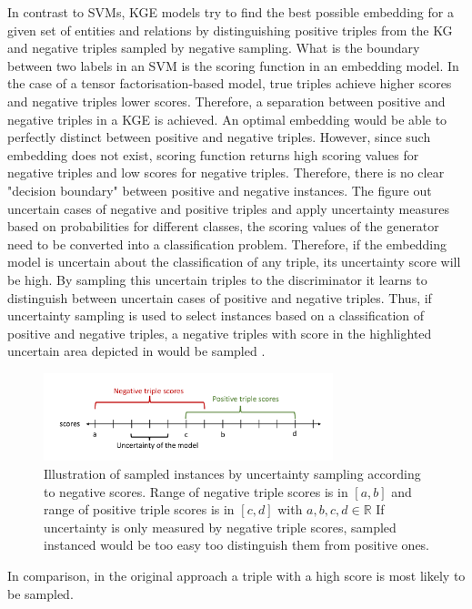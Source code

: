 In contrast to \acp{SVM}, \ac{KGE} models try to find the best possible embedding for a given set of entities and relations by distinguishing positive triples from the \ac{KG} and negative triples sampled by negative sampling.
What is the boundary between two labels in an \ac{SVM} is the scoring function in an embedding model.
In the case of a tensor factorisation-based model, true triples achieve higher scores and negative triples lower scores.
Therefore, a separation between positive and negative triples in a \ac{KGE} is achieved.
An optimal embedding would be able to perfectly distinct between positive and negative triples.
However, since such embedding does not exist, scoring function returns high scoring values for negative triples and low scores for negative triples.
Therefore, there is no clear "decision boundary" between positive and negative instances.
The figure out uncertain cases of negative and positive triples and apply uncertainty measures based on probabilities for different classes, the scoring values of the generator need to be converted into a classification problem.
Therefore, if the embedding model is uncertain about the classification of any triple, its uncertainty score will be high.
By sampling this uncertain triples to the discriminator it learns to distinguish between uncertain cases of positive and negative triples.
Thus, if uncertainty sampling is used to select instances based on a classification of positive and negative triples, a negative triples with score in the highlighted uncertain area depicted in  would be sampled .
\begin{figure}[t]
  \centering
    \includegraphics[width=0.75\textwidth]{figures/badVsGoodApproach.pdf}
  \caption{Illustration of sampled instances by uncertainty sampling according to negative scores.
  Range of negative triple scores is in $[a, b]$ and range of positive triple scores is in  $[c, d]$ with $a,b,c,d \in \mathbb{R}$
  If uncertainty is only measured by negative triple scores, sampled instanced would be too easy too distinguish them from positive ones.}
  \label{fig:badVsGoodApproach}
\end{figure}
In comparison, in the original \kbgan approach a triple with a high score is most likely to be sampled.
